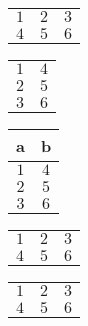 \begin{table}[ht]
  \begin{center}
    \begin{tabular}{ccc}
      \toprule
      $1$ & $2$ & $3$\\
      $4$ & $5$ & $6$\\
      \bottomrule
    \end{tabular}
  \end{center}
\end{table}
\begin{table}[ht]
  \begin{center}
    \begin{tabular}{cc}
      \toprule
      $1$ & $4$\\
      $2$ & $5$\\
      $3$ & $6$\\
      \bottomrule
    \end{tabular}
  \end{center}
\end{table}
\begin{table}[ht]
  \begin{center}
    \begin{tabular}{cc}
      \toprule
      a & b\\
      \midrule
      $1$ & $4$\\
      $2$ & $5$\\
      $3$ & $6$\\
      \bottomrule
    \end{tabular}
  \end{center}
\end{table}
\begin{table}[ht]
  \begin{center}
    \label{tab:tmp}
    \begin{tabular}{ccc}
      \toprule
      $1$ & $2$ & $3$\\
      $4$ & $5$ & $6$\\
      \bottomrule
    \end{tabular}
  \end{center}
\end{table}
\begin{table}[ht]
  \begin{center}
    \begin{tabular}{ccc}
      \toprule
      $1$ & $2$ & $3$\\
      $4$ & $5$ & $6$\\
      \bottomrule
    \end{tabular}
  \end{center}
\end{table}
